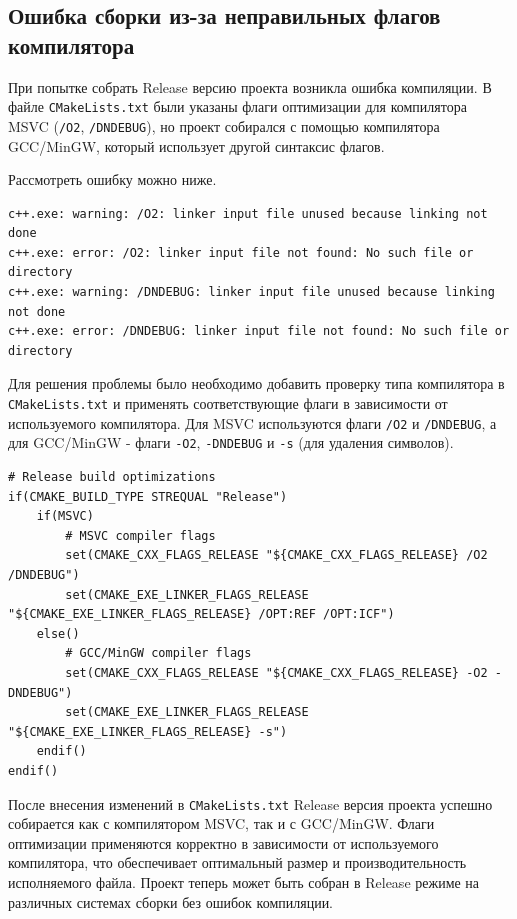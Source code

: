 \subsection{Ошибка сборки из-за неправильных флагов компилятора}

При попытке собрать Release версию проекта возникла ошибка компиляции.
В файле \texttt{CMakeLists.txt} были указаны флаги оптимизации для компилятора
MSVC (\texttt{/O2}, \texttt{/DNDEBUG}), но проект собирался с помощью компилятора
GCC/MinGW, который использует другой синтаксис флагов.

Рассмотреть ошибку можно ниже.

\begin{lstlisting}[style=CodeListing]
c++.exe: warning: /O2: linker input file unused because linking not done
c++.exe: error: /O2: linker input file not found: No such file or directory
c++.exe: warning: /DNDEBUG: linker input file unused because linking not done
c++.exe: error: /DNDEBUG: linker input file not found: No such file or directory
\end{lstlisting}

Для решения проблемы было необходимо добавить проверку типа компилятора в
\texttt{CMakeLists.txt} и применять соответствующие флаги в зависимости от
используемого компилятора. Для MSVC используются флаги \texttt{/O2} и \texttt{/DNDEBUG}, а
для GCC/MinGW - флаги \texttt{-O2}, \texttt{-DNDEBUG} и \texttt{-s} (для удаления символов).

\begin{lstlisting}[style=CodeListing]
# Release build optimizations
if(CMAKE_BUILD_TYPE STREQUAL "Release")
    if(MSVC)
        # MSVC compiler flags
        set(CMAKE_CXX_FLAGS_RELEASE "${CMAKE_CXX_FLAGS_RELEASE} /O2 /DNDEBUG")
        set(CMAKE_EXE_LINKER_FLAGS_RELEASE "${CMAKE_EXE_LINKER_FLAGS_RELEASE} /OPT:REF /OPT:ICF")
    else()
        # GCC/MinGW compiler flags
        set(CMAKE_CXX_FLAGS_RELEASE "${CMAKE_CXX_FLAGS_RELEASE} -O2 -DNDEBUG")
        set(CMAKE_EXE_LINKER_FLAGS_RELEASE "${CMAKE_EXE_LINKER_FLAGS_RELEASE} -s")
    endif()
endif()
\end{lstlisting}

После внесения изменений в \texttt{CMakeLists.txt} Release версия проекта успешно собирается
как с компилятором MSVC, так и с GCC/MinGW. Флаги оптимизации применяются корректно
в зависимости от используемого компилятора, что обеспечивает оптимальный размер и
производительность исполняемого файла. Проект теперь может быть собран в Release
режиме на различных системах сборки без ошибок компиляции.